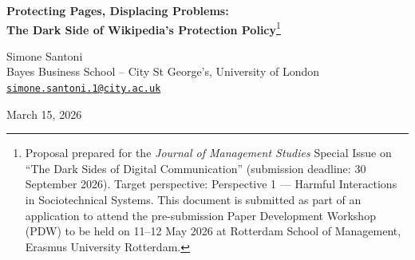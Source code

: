 \documentclass[11pt]{article}
\begin{document}

\begin{center}
{\LARGE \textbf{Protecting Pages, Displacing Problems:\\[2pt]
The Dark Side of Wikipedia's Protection Policy}\footnote{Proposal prepared for the \emph{Journal of Management Studies} Special Issue on ``The Dark Sides of Digital Communication'' (submission deadline: 30 September 2026). Target perspective: Perspective 1 --- Harmful Interactions in Sociotechnical Systems. This document is submitted as part of an application to attend the pre-submission Paper Development Workshop (PDW) to be held on 11--12 May 2026 at Rotterdam School of Management, Erasmus University Rotterdam.}}

\vspace{18pt}

{\large Simone Santoni}\\[2pt]
Bayes Business School -- City St George's, University of London\\[2pt]
\href{mailto:simone.santoni.1@city.ac.uk}{\texttt{simone.santoni.1@city.ac.uk}}

\vspace{14pt}

{\large March 15, 2026}
\end{center}

\vspace{14pt}

\begin{abstract}
\noindent This paper investigates how Wikipedia's page protection policy---a content moderation mechanism that restricts editing access---reshapes editor--page relational dynamics, interaction patterns, and edit quality. I develop a framework integrating three mechanisms: (1)~\emph{attention reallocation}, whereby displaced editors redirect contributions toward topically proximate articles; (2)~\emph{core--periphery consolidation}, whereby protection excludes peripheral contributors, concentrating editorial power among insiders; and (3)~\emph{coalition migration}, whereby subgroups of jointly displaced editors reconstitute collaborative and adversarial dynamics on new pages. I propose to test these mechanisms using polyadic relational hyperevent models that capture multi-party editing events across the editor--page network. Identification leverages a matching strategy comparing articles whose protection requests were granted with those whose requests were denied. The study contributes to understanding how sociotechnical design elements intended to protect digital communities can inadvertently displace conflict and produce harmful interactions beyond the protected page.

\vspace{6pt}

\noindent\textbf{Keywords:} page protection; content moderation; Wikipedia; editor attachment; core--periphery dynamics; political coalitions; relational hyperevent models; sociotechnical systems; digital harm
\end{abstract}
\end{document}
